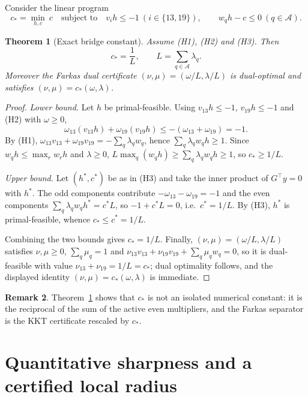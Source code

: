 \documentclass[11pt]{article}
\newtheorem{theorem}{Theorem}[section]
\theoremstyle{definition}
\newtheorem{remark}[theorem]{Remark}
\begin{document}
Consider the linear program
\begin{equation}\label{eq:LP}
c_*=\min_{h,c}\ c\quad\text{subject to}\quad v_ih\le-1\ (i\in\{13,19\}),\qquad w_qh-c\le0\ (q\in\mathcal A).
\end{equation}

\begin{theorem}[Exact bridge constant]\label{thm:bridge}
Assume \textup{(H1)}, \textup{(H2)} and \textup{(H3)}. Then
\[
c_*=\frac1L,\qquad L=\sum_{q\in\mathcal A}\lambda_q .
\]
Moreover the Farkas dual certificate $(\nu,\mu)=(\omega/L,\lambda/L)$ is dual-optimal and satisfies
$(\nu,\mu)=c_*(\omega,\lambda)$.
\end{theorem}
\begin{proof}
\emph{Lower bound.} Let $h$ be primal-feasible. Using $v_{13}h\le-1$, $v_{19}h\le-1$ and
\textup{(H2)} with $\omega\ge0$,
\[
\omega_{13}(v_{13}h)+\omega_{19}(v_{19}h)\le-(\omega_{13}+\omega_{19})=-1 .
\]
By \textup{(H1)}, $\omega_{13}v_{13}+\omega_{19}v_{19}=-\sum_{q}\lambda_qw_q$, hence
$\sum_q\lambda_qw_qh\ge1$. Since $w_qh\le\max_r w_rh$ and $\lambda\ge0$,
$L\max_q(w_qh)\ge\sum_q\lambda_qw_qh\ge1$, so $c_*\ge1/L$.

\emph{Upper bound.} Let $(h^\ast,c^\ast)$ be as in \textup{(H3)} and take the inner product of
$G^{\top}y=0$ with $h^\ast$. The odd components contribute $-\omega_{13}-\omega_{19}=-1$ and the even
components $\sum_q\lambda_qw_qh^\ast=c^\ast L$, so $-1+c^\ast L=0$, i.e.\ $c^\ast=1/L$. By
\textup{(H3)}, $h^\ast$ is primal-feasible, whence $c_*\le c^\ast=1/L$.

Combining the two bounds gives $c_*=1/L$. Finally, $(\nu,\mu)=(\omega/L,\lambda/L)$ satisfies
$\nu,\mu\ge0$, $\sum_q\mu_q=1$ and $\nu_{13}v_{13}+\nu_{19}v_{19}+\sum_q\mu_qw_q=0$, so it is
dual-feasible with value $\nu_{13}+\nu_{19}=1/L=c_*$; dual optimality follows, and the displayed
identity $(\nu,\mu)=c_*(\omega,\lambda)$ is immediate.
\end{proof}

\begin{remark}
Theorem~\ref{thm:bridge} shows that $c_*$ is not an isolated numerical constant: it is the
reciprocal of the sum of the active even multipliers, and the Farkas separator is the KKT certificate
rescaled by $c_*$.
\end{remark}

\section{Quantitative sharpness and a certified local radius}\label{sec:sharp}
\end{document}
